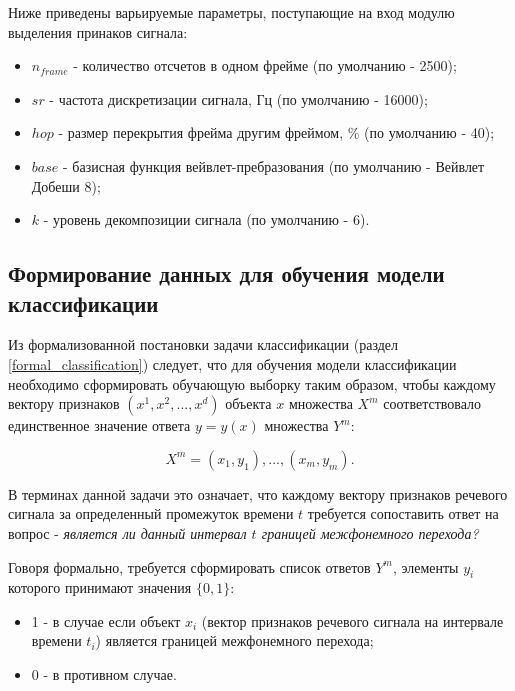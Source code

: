 \documentclass[utf8x, 14pt, oneside, a4paper]{article}
\begin{document}
	Ниже приведены варьируемые параметры, поступающие на вход модулю выделения принаков сигнала:
	
	\begin{itemize}
		\item $n_{frame}$ - количество отсчетов в одном фрейме (по умолчанию - 2500);
		\item $sr$ - частота дискретизации сигнала, Гц (по умолчанию - 16000);
		\item $hop$ - размер перекрытия фрейма другим фреймом, \% (по умолчанию - 40);
		\item $base$ - базисная функция вейвлет-пребразования (по умолчанию - Вейвлет Добеши 8);
		\item $k$ - уровень декомпозиции сигнала (по умолчанию - 6).
	\end{itemize}
	
	\subsection{Формирование данных для обучения модели классификации}
	
	Из формализованной постановки задачи классификации (раздел \ref{formal_classification}) следует, что для обучения модели классификации необходимо сформировать обучающую выборку таким образом, чтобы каждому вектору признаков \linebreak $(x^1, x^2, ..., x^d)$ объекта $x$ множества $X^m$ соответствовало единственное значение ответа $y = y(x)$ множества $Y^m$:
	
	\begin{equation}
		X^m = {(x_1, y_1), ..., (x_m, y_m)}.
	\end{equation}
	
	В терминах данной задачи это означает, что каждому вектору признаков речевого сигнала за определенный промежуток времени $t$ требуется сопоставить ответ на вопрос - \textit{является ли данный интервал $t$ границей межфонемного перехода?}
	
	Говоря формально, требуется сформировать список ответов $Y^m$, элементы $y_i$ которого принимают значения $\{0, 1\}$:
	
	\begin{itemize}
		\item 1 - в случае если объект $x_i$ (вектор признаков речевого сигнала на интервале времени $t_i$) является границей межфонемного перехода;
		\item 0 - в противном случае.
	\end{itemize}
\end{document}
